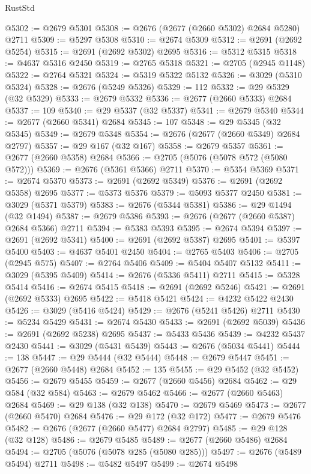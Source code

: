 \begin{lexlean}{RustStd}
\begin{coremodule}
@5302 := @2679 @5301
@5308 := @2676 (@2677 (@2660 @5302) @2684 @5280) @2711
@5309 := @5297 @5308
@5310 := @2674 @5309
@5312 := @2691 (@2692 @5254)
@5315 := @2691 (@2692 @5302) @2695
@5316 := @5312 @5315
@5318 := @4637 @5316 @2450
@5319 := @2765 @5318
@5321 := @2705 (@2945 @1148)
@5322 := @2764 @5321
@5324 := @5319 @5322 @5132
@5326 := @3029 (@5310 @5324)
@5328 := @2676 (@5249 @5326)
@5329 := 112
@5332 := @29 @5329 (@32 @5329)
@5333 := @2679 @5332
@5336 := @2677 (@2660 @5333) @2684
@5337 := 109
@5340 := @29 @5337 (@32 @5337)
@5341 := @2679 @5340
@5344 := @2677 (@2660 @5341) @2684
@5345 := 107
@5348 := @29 @5345 (@32 @5345)
@5349 := @2679 @5348
@5354 := @2676 (@2677 (@2660 @5349) @2684 @2797)
@5357 := @29 @167 (@32 @167)
@5358 := @2679 @5357
@5361 := @2677 (@2660 @5358) @2684
@5366 := @2705 (@5076 (@5078 @572 (@5080 @572)))
@5369 := @2676 (@5361 @5366) @2711
@5370 := @5354 @5369
@5371 := @2674 @5370
@5373 := @2691 (@2692 @5349)
@5376 := @2691 (@2692 @5358) @2695
@5377 := @5373 @5376
@5379 := @5093 @5377 @2450
@5381 := @3029 (@5371 @5379)
@5383 := @2676 (@5344 @5381)
@5386 := @29 @1494 (@32 @1494)
@5387 := @2679 @5386
@5393 := @2676 (@2677 (@2660 @5387) @2684 @5366) @2711
@5394 := @5383 @5393
@5395 := @2674 @5394
@5397 := @2691 (@2692 @5341)
@5400 := @2691 (@2692 @5387) @2695
@5401 := @5397 @5400
@5403 := @4637 @5401 @2450
@5404 := @2765 @5403
@5406 := @2705 (@2945 @575)
@5407 := @2764 @5406
@5409 := @5404 @5407 @5132
@5411 := @3029 (@5395 @5409)
@5414 := @2676 (@5336 @5411) @2711
@5415 := @5328 @5414
@5416 := @2674 @5415
@5418 := @2691 (@2692 @5246)
@5421 := @2691 (@2692 @5333) @2695
@5422 := @5418 @5421
@5424 := @4232 @5422 @2430
@5426 := @3029 (@5416 @5424)
@5429 := @2676 (@5241 @5426) @2711
@5430 := @5234 @5429
@5431 := @2674 @5430
@5433 := @2691 (@2692 @5039)
@5436 := @2691 (@2692 @5238) @2695
@5437 := @5433 @5436
@5439 := @4232 @5437 @2430
@5441 := @3029 (@5431 @5439)
@5443 := @2676 (@5034 @5441)
@5444 := 138
@5447 := @29 @5444 (@32 @5444)
@5448 := @2679 @5447
@5451 := @2677 (@2660 @5448) @2684
@5452 := 135
@5455 := @29 @5452 (@32 @5452)
@5456 := @2679 @5455
@5459 := @2677 (@2660 @5456) @2684
@5462 := @29 @584 (@32 @584)
@5463 := @2679 @5462
@5466 := @2677 (@2660 @5463) @2684
@5469 := @29 @138 (@32 @138)
@5470 := @2679 @5469
@5473 := @2677 (@2660 @5470) @2684
@5476 := @29 @172 (@32 @172)
@5477 := @2679 @5476
@5482 := @2676 (@2677 (@2660 @5477) @2684 @2797)
@5485 := @29 @128 (@32 @128)
@5486 := @2679 @5485
@5489 := @2677 (@2660 @5486) @2684
@5494 := @2705 (@5076 (@5078 @285 (@5080 @285)))
@5497 := @2676 (@5489 @5494) @2711
@5498 := @5482 @5497
@5499 := @2674 @5498

\end{coremodule}
\end{lexlean}
